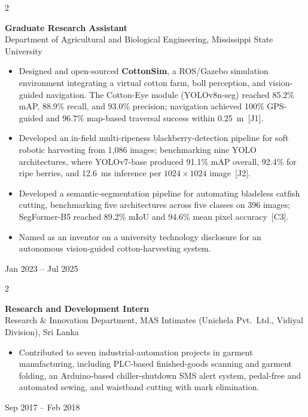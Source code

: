 \documentclass[10pt, letterpaper]{article}
\newenvironment{highlights}{%
    \begin{itemize}[topsep=0.08cm, parsep=0.08cm, partopsep=0pt,
                    itemsep=0pt, leftmargin=0.4cm + 10pt]
}{\end{itemize}}
\newenvironment{twocolentry}[2][]{%
    \onecolentry
    \def\secondColumn{#2}
    \setcolumnwidth{\fill, 4.2cm}
    \begin{paracol}{2}
}{%
    \switchcolumn \raggedleft \secondColumn
    \end{paracol}
    \endonecolentry
}
\begin{document}
\begin{twocolentry}{Jan 2023 -- Jul 2025}
    \textbf{Graduate Research Assistant} \\
    Department of Agricultural and Biological Engineering,
    Mississippi State University
    \begin{highlights}
        \item Designed and open-sourced \textbf{CottonSim}, a ROS/Gazebo simulation
              environment integrating a virtual cotton farm, boll perception, and
              vision-guided navigation. The Cotton-Eye module (YOLOv8n-seg) reached
              85.2\% mAP, 88.9\% recall, and 93.0\% precision; navigation achieved
              100\% GPS-guided and 96.7\% map-based traversal success within
              0.25~m~[J1].

        \item Developed an in-field multi-ripeness blackberry-detection pipeline for
              soft robotic harvesting from 1{,}086 images; benchmarking nine YOLO
              architectures, where YOLOv7-base produced 91.1\% mAP overall, 92.4\%
              for ripe berries, and 12.6~ms inference per
              $1024 \times 1024$ image~[J2].

        \item Developed a semantic-segmentation pipeline for automating bladeless
              catfish cutting, benchmarking five architectures across five classes on
              396 images; SegFormer-B5 reached 89.2\% mIoU and 94.6\% mean pixel
              accuracy~[C3].

        \item Named as an inventor on a university technology disclosure for an
              autonomous vision-guided cotton-harvesting system.
    \end{highlights}
    \vspace{0.12cm}
\end{twocolentry}

\begin{twocolentry}{Sep 2017 -- Feb 2018}
    \textbf{Research and Development Intern} \\
    Research \& Innovation Department, MAS Intimates
    (Unichela Pvt.\ Ltd., Vidiyal Division), Sri Lanka
    \begin{highlights}
        \item Contributed to seven industrial-automation projects in garment
              manufacturing, including PLC-based finished-goods scanning and garment
              folding, an Arduino-based chiller-shutdown SMS alert system,
              pedal-free and automated sewing, and waistband cutting with mark
              elimination.
    \end{highlights}
    \vspace{0.08cm}
\end{twocolentry}
\end{document}
